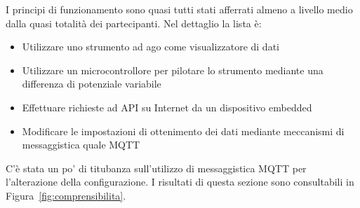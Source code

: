 \documentclass[12pt,a4paper]{report}
\begin{document}
I principi di funzionamento sono quasi tutti stati afferrati almeno a livello medio dalla quasi totalità dei partecipanti. Nel dettaglio la lista è:
\begin{itemize}
  \item Utilizzare uno strumento ad ago come visualizzatore di dati
  \item Utilizzare un microcontrollore per pilotare lo strumento mediante una differenza di potenziale variabile
  \item Effettuare richieste ad API su Internet da un dispositivo embedded
  \item Modificare le impostazioni di ottenimento dei dati mediante meccanismi di messaggistica quale MQTT
\end{itemize}
C'è stata un po' di titubanza sull'utilizzo di messaggistica MQTT per l'alterazione della configurazione.
I risultati di questa sezione sono consultabili in Figura~\ref{fig:comprensibilita}.
\end{document}
